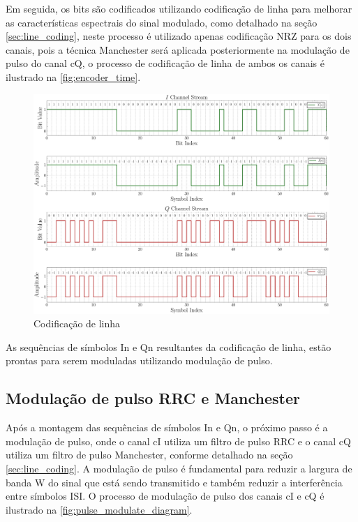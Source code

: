 Em seguida, os bits são codificados utilizando codificação de linha para melhorar as características espectrais do sinal modulado, como detalhado na seção \ref{sec:line_coding}, neste processo é utilizado apenas codificação \gls{NRZ} para os dois canais, pois a técnica \gls{Manchester} será aplicada posteriormente na modulação de pulso do canal \gls{cQ}, o processo de codificação de linha de ambos os canais é ilustrado na \autoref{fig:encoder_time}.

\begin{figure}[H]
	\centering
	\caption{Codificação de linha}\label{fig:encoder_time}
	\includegraphics[width=\linewidth]{assets/cap3/transmitter_encoder_time.pdf}
\end{figure}

As sequências de símbolos \gls{In} e \gls{Qn} resultantes da codificação de linha, estão prontas para serem moduladas utilizando modulação de pulso. 

\subsection{Modulação de pulso RRC e Manchester}

Após a montagem das sequências de símbolos \gls{In} e \gls{Qn}, o próximo passo é a modulação de pulso, onde o canal \gls{cI} utiliza um filtro de pulso \gls{RRC} e o canal \gls{cQ} utiliza um filtro de pulso \gls{Manchester}, conforme detalhado na seção \ref{sec:line_coding}. A modulação de pulso é fundamental para reduzir a largura de banda \gls{W} do sinal que está sendo transmitido e também reduzir a interferência entre símbolos \gls{ISI}. O processo de modulação de pulso dos canais \gls{cI} e \gls{cQ} é ilustrado na \autoref{fig:pulse_modulate_diagram}.

